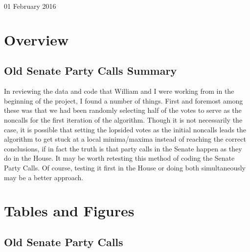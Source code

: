 \documentclass[12pt]{article}
\begin{document}
\begin{center}
\Large 01 February 2016
\end{center}

\section{Overview}

\subsection{Old Senate Party Calls Summary}

In reviewing the data and code that William and I were working from in the beginning of the project, I found a number of things. First and foremost among these was that we had been randomly selecting half of the votes to serve as the noncalls for the first iteration of the algorithm. Though it is not necessarily the case, it is possible that setting the lopsided votes as the initial noncalls leads the algorithm to get stuck at a local minima/maxima instead of reaching the correct conclusions, if in fact the truth is that party calls in the Senate happen as they do in the House. It may be worth retesting this method of coding the Senate Party Calls. Of course, testing it first in the House or doing both simultaneously may be a better approach.


\section{Tables and Figures}

\subsection{Old Senate Party Calls}
\end{document}
